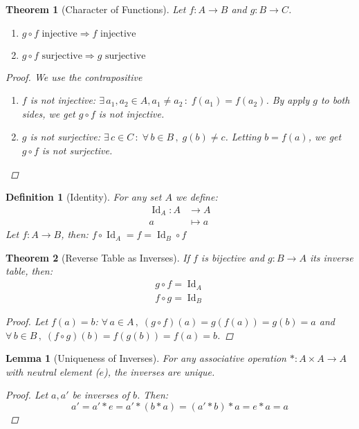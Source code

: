 \documentclass[12pt]{article}
\let\RA\Rightarrow
\newcommand{\Forall}[1]{\forall\,{#1}\,,\;}
\newcommand{\Exist}[1]{\exists\,{#1}\,:\;}
\DeclareMathOperator{\Id}{Id}
\newtheorem{theorem}{Theorem}[subsection]
\newtheorem{definition}{Definition}[subsection]
\newtheorem{lemma}{Lemma}[subsection]
\begin{document}
\begin{theorem}[Character of Functions]
  Let $f:A\to B$ and $g:B\to C$.
  \begin{enumerate}
    \item $g\circ f\text{ injective}\RA f\text{ injective}$
    \item $g\circ f\text{ surjective}\RA g\text{ surjective}$
  \end{enumerate}
  \begin{proof}
    We use the contrapositive
    \begin{enumerate}
      \item $f$ is not injective: $\Exist{a_1,a_2\in A,a_1\neq a_2} f(a_1)=f(a_2)$. By apply $g$ to both sides, we get $g\circ f$ is not injective.
      \item $g$ is not surjective: $\Exist{c\in C}\Forall{b\in B} g(b)\neq c$. Letting $b=f(a)$, we get $g\circ f$ is not surjective.
    \end{enumerate}
  \end{proof}
\end{theorem}

\begin{definition}[Identity]
  For any set $A$ we define:
  \begin{align*}
    \Id_A: A&\to A\\
    a&\mapsto a
  \end{align*}
  Let $f:A\to B$, then: $f\circ \Id_A=f=\Id_B\circ f$
\end{definition}

\begin{theorem}[Reverse Table as Inverses]
  If $f$ is bijective and $g: B \to A$ its inverse table, then:
  \begin{align*}
    g\circ f=\Id_A\\
    f\circ g=\Id_B
  \end{align*}
  \begin{proof}
    Let $f(a)=b$: $\Forall{a\in A}(g\circ f)(a)=g(f(a))=g(b)=a$ and $\Forall{b\in B}(f\circ g)(b)=f(g(b))=f(a)=b$.
  \end{proof}
\end{theorem}

\begin{lemma}[Uniqueness of Inverses]
  For any associative operation $*:A\times A\to A$ with neutral element ($e$), the inverses are unique.
  \begin{proof}
    Let $a,a'$ be inverses of $b$. Then:
    $$a'=a'*e=a'*(b*a)=(a'*b)*a=e*a=a$$
  \end{proof}
\end{lemma}
\end{document}
